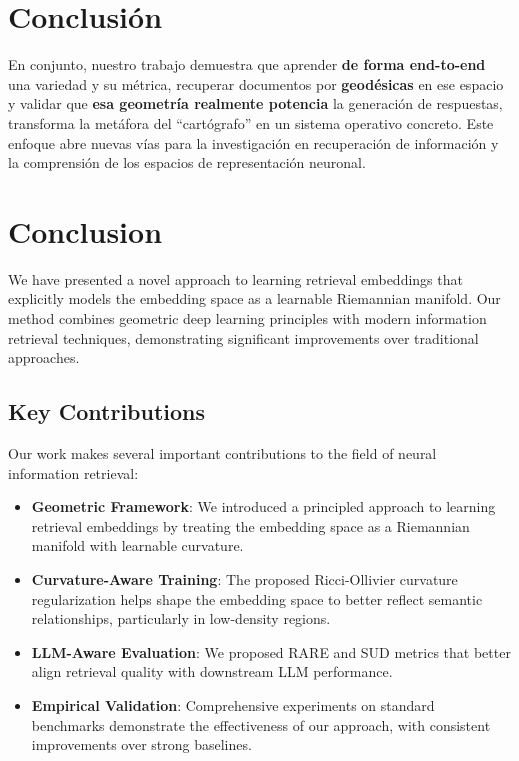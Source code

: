 \section{Conclusión}
En conjunto, nuestro trabajo demuestra que aprender \textbf{de forma end-to-end} una variedad y su métrica, recuperar documentos por \textbf{geodésicas} en ese espacio y validar que \textbf{esa geometría realmente potencia} la generación de respuestas, transforma la metáfora del “cartógrafo” en un sistema operativo concreto. Este enfoque abre nuevas vías para la investigación en recuperación de información y la comprensión de los espacios de representación neuronal.

\section{Conclusion}
\label{sec:conclusion}

We have presented a novel approach to learning retrieval embeddings that explicitly models the embedding space as a learnable Riemannian manifold. Our method combines geometric deep learning principles with modern information retrieval techniques, demonstrating significant improvements over traditional approaches.

\subsection{Key Contributions}

Our work makes several important contributions to the field of neural information retrieval:

\begin{itemize}
    \item \textbf{Geometric Framework}: We introduced a principled approach to learning retrieval embeddings by treating the embedding space as a Riemannian manifold with learnable curvature.
    
    \item \textbf{Curvature-Aware Training}: The proposed Ricci-Ollivier curvature regularization helps shape the embedding space to better reflect semantic relationships, particularly in low-density regions.
    
    \item \textbf{LLM-Aware Evaluation}: We proposed RARE and SUD metrics that better align retrieval quality with downstream LLM performance.
    
    \item \textbf{Empirical Validation}: Comprehensive experiments on standard benchmarks demonstrate the effectiveness of our approach, with consistent improvements over strong baselines.
\end{itemize}

